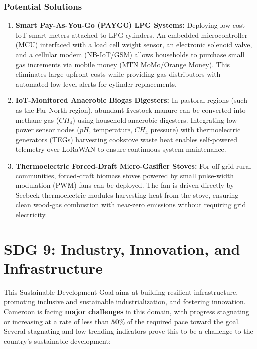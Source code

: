 \documentclass[11pt, a4paper]{article}
\begin{document}
\subsubsection*{Potential Solutions}
\begin{enumerate}
  \item \textbf{Smart Pay-As-You-Go (PAYGO) LPG Systems:} Deploying low-cost IoT smart meters attached to LPG cylinders. An embedded microcontroller (MCU) interfaced with a load cell weight sensor, an electronic solenoid valve, and a cellular modem (NB-IoT/GSM) allows households to purchase small gas increments via mobile money (MTN MoMo/Orange Money). This eliminates large upfront costs while providing gas distributors with automated low-level alerts for cylinder replacements.
  \item \textbf{IoT-Monitored Anaerobic Biogas Digesters:} In pastoral regions (such as the Far North region), abundant livestock manure can be converted into methane gas ($CH_4$) using household anaerobic digesters. Integrating low-power sensor nodes ($pH$, temperature, $CH_4$ pressure) with thermoelectric generators (TEGs) harvesting cookstove waste heat enables self-powered telemetry over LoRaWAN to ensure continuous system maintenance.
  \item \textbf{Thermoelectric Forced-Draft Micro-Gasifier Stoves:} For off-grid rural communities, forced-draft biomass stoves powered by small pulse-width modulation (PWM) fans can be deployed. The fan is driven directly by Seebeck thermoelectric modules harvesting heat from the stove, ensuring clean wood-gas combustion with near-zero emissions without requiring grid electricity.
\end{enumerate}

\section{SDG 9: Industry, Innovation, and Infrastructure}
This Sustainable Development Goal aims at building resilient infrastructure, promoting inclusive and sustainable industrialization, and fostering innovation. Cameroon is facing \textbf{major challenges} in this domain, with progress stagnating or increasing at a rate of less than $\mathbf{50\%}$ of the required pace toward the goal. Several stagnating and low-trending indicators prove this to be a challenge to the country's sustainable development:
\end{document}
